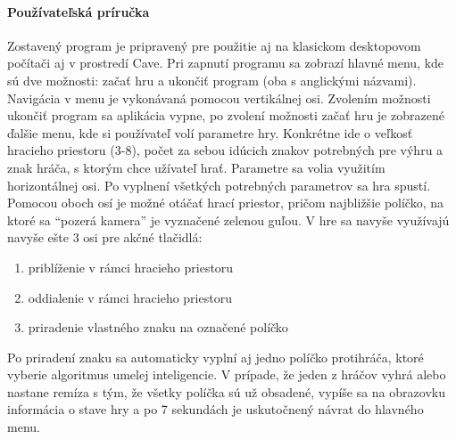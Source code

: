 \paragraph{Používateľská príručka}
Zostavený program je pripravený pre použitie aj na klasickom desktopovom počítači aj v prostredí Cave.
Pri zapnutí programu sa zobrazí hlavné menu, kde sú dve možnosti: začať hru a ukončiť program (oba s anglickými
názvami).
Navigácia v menu je vykonávaná pomocou vertikálnej osi.
Zvolením možnosti ukončiť program sa aplikácia vypne, po zvolení možnosti začať hru je zobrazené ďalšie menu, kde si
používateľ volí parametre hry.
Konkrétne ide o veľkosť hracieho priestoru (3-8), počet za sebou idúcich znakov potrebných pre výhru a znak hráča, s
ktorým chce užívateľ hrať.
Parametre sa volia využitím horizontálnej osi.
Po vyplnení všetkých potrebných parametrov sa hra spustí.
Pomocou oboch osí je možné otáčať hrací priestor, pričom najbližšie políčko, na ktoré sa \enquote{pozerá kamera} je
vyznačené zelenou guľou.
V hre sa navyše využívajú navyše ešte 3 osi pre akčné tlačidlá:
\begin{enumerate}
    \item priblíženie v rámci hracieho priestoru
    \item oddialenie v rámci hracieho priestoru
    \item priradenie vlastného znaku na označené políčko
\end{enumerate}
Po priradení znaku sa automaticky vyplní aj jedno políčko protihráča, ktoré vyberie algoritmus umelej inteligencie.
V prípade, že jeden z hráčov vyhrá alebo nastane remíza s tým, že všetky políčka sú už obsadené, vypíše sa na obrazovku
informácia o stave hry a po 7 sekundách je uskutočnený návrat do hlavného menu.

